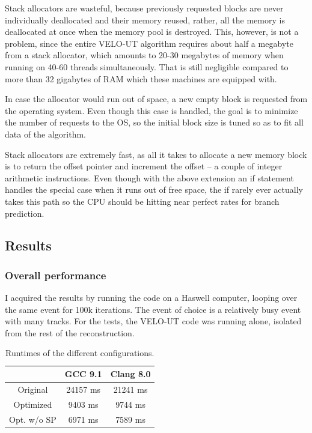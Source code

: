 \documentclass[12pt]{article}
\begin{document}
Stack allocators are wasteful, because previously requested blocks are never individually deallocated and their memory reused, rather, all the memory is deallocated at once when the memory pool is destroyed. This, however, is not a problem, since the entire VELO-UT algorithm requires about half a megabyte from a stack allocator, which amounts to 20-30 megabytes of memory when running on 40-60 threads simultaneously. That is still negligible compared to more than 32 gigabytes of RAM which these machines are equipped with.

In case the allocator would run out of space, a new empty block is requested from the operating system. Even though this case is handled, the goal is to minimize the number of requests to the OS, so the initial block size is tuned so as to fit all data of the algorithm.

Stack allocators are extremely fast, as all it takes to allocate a new memory block is to return the offset pointer and increment the offset -- a couple of integer arithmetic instructions. Even though with the above extension an if statement handles the special case when it runs out of free space, the if rarely ever actually takes this path so the CPU should be hitting near perfect rates for branch prediction.


\subsection{Results}

\subsubsection{Overall performance}

I acquired the results by running the code on a Haswell computer, looping over the same event for 100k iterations. The event of choice is a relatively busy event with many tracks. For the tests, the VELO-UT code was running alone, isolated from the rest of the reconstruction.

\begin{table}[H]
	\centering
	\begin{tabular}{c | c | c}
		& GCC 9.1 & Clang 8.0 \\
		\hline
		Original & 24157 ms & 21241 ms \\
		\hline
		Optimized & 9403 ms & 9744 ms \\
		\hline
		Opt. w/o SP & 6971 ms & 7589 ms
	\end{tabular}
	\caption{Runtimes of the different configurations.}
	\label{tbl_runtimes_local}
\end{table}
	
\end{document}
